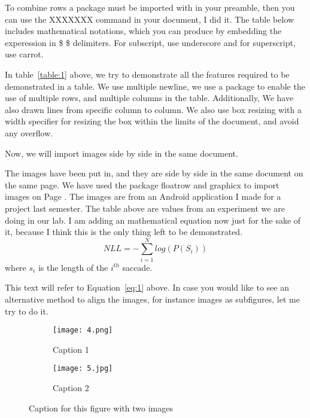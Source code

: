 \documentclass[12pt,a4paper,titlepage]{article}
\begin{document}
To combine rows a package must be imported with in your preamble, then you can use the XXXXXXX command in your document, I did it. The table below includes mathematical notations, which you can produce by embedding the experession in \$ \$ delimiters. For subscript, use underscore and for superscript, use carrot.

{\Large

In table~\ref{table:1} above, we try to demonstrate all the features required to be demonstrated in a table. We use multiple newline, we use a package to enable the use of multiple rows, and multiple columns in the table. Additionally, We have also drawn lines from specific column to column. We also use box resizing with a width specifier for resizing the box within the limits of the document, and avoid any overflow.
}

Now, we will import images side by side in the same document.
\begin{figure}[H]
  {\label{fig:app}}
\end{figure}

The images have been put in, and they are side by side in the same document on the same page. We have used the package floatrow and graphicx to import images on Page \pageref{fig:app}. The images are from an Android application I made for a project last semester. The table above are values from an experiment we are doing in our lab. I am adding an mathematical equation now just for the sake of it, because I think this is the only thing left to be demonstrated.
\begin{equation} \label{eq:1}
NLL = -\sum_{i=1}^{N}log(P(S_i))
\end{equation}
where $s_i$ is the length of the $i^{th}$ saccade.

This text will refer to Equation~\ref{eq:1} above. In case you would like to see an alternative method to align the images, for instance images as subfigures, let me try to do it.
\begin{figure}[H]
\centering
\begin{subfigure}{0.49\textwidth}
  \centering
  \texttt{[image: 4.png]}
  \caption{Caption 1}
  \label{fig:capl}
\end{subfigure}
\begin{subfigure}{0.49\textwidth}
  \centering
  \texttt{[image: 5.jpg]}
  \caption{Caption 2}
  \label{fig:capr}
\end{subfigure}
  \caption{Caption for this figure with two images}
  \label{fig:cap}
\end{figure}
\end{document}
